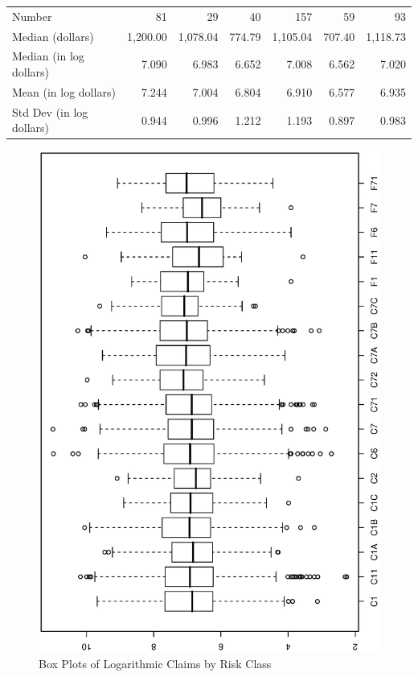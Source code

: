 \begin{table}[h]
\begin{tabular}{l|rrrrrr}
    Number &         81 &         29 &         40 &        157 &         59 &         93 \\
Median (dollars) &   1,200.00 &   1,078.04 &     774.79 &   1,105.04 &     707.40 &   1,118.73 \\
Median (in log dollars) &      7.090 &      6.983 &      6.652 &      7.008 &      6.562 &      7.020 \\
Mean (in log dollars) &      7.244 &      7.004 &      6.804 &      6.910 &      6.577 &      6.935 \\
Std Dev (in log dollars) &      0.944 &      0.996 &      1.212 &
1.193 &      0.897 &      0.983 \\
\hline
\end{tabular}
\end{table}

\begin{figure}[htp]
  \begin{center}
    \includegraphics[width=1\textwidth,angle=270,scale=0.75]{Chapter4/Fig4BoxplotAuto.ps}
        \caption{\label{F4:BoxplotAuto} \small  Box Plots of Logarithmic Claims by Risk Class}
  \end{center}
\end{figure}

